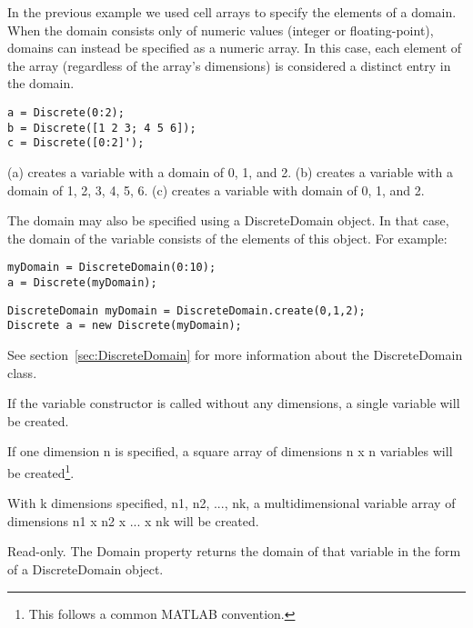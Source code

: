 In the previous example we used cell arrays to specify the elements of a domain.  When the domain consists only of numeric values (integer or floating-point), domains can instead be specified as a numeric array.  In this case, each element of the array (regardless of the array's dimensions) is considered a distinct entry in the domain.

\begin{lstlisting}
a = Discrete(0:2);
b = Discrete([1 2 3; 4 5 6]);
c = Discrete([0:2]');
\end{lstlisting}

(a) creates a variable with a domain of 0, 1, and 2.  (b) creates a variable with a domain of 1, 2, 3, 4, 5, 6.  (c) creates a variable with domain of 0, 1, and 2.

\fi

The domain may also be specified using a DiscreteDomain object.  In that case, the domain of the variable consists of the elements of this object.  For example:

\ifmatlab
\begin{lstlisting}
myDomain = DiscreteDomain(0:10);
a = Discrete(myDomain);
\end{lstlisting}
\fi

\ifjava
\begin{lstlisting}
DiscreteDomain myDomain = DiscreteDomain.create(0,1,2);
Discrete a = new Discrete(myDomain);
\end{lstlisting}
\fi

See section~\ref{sec:DiscreteDomain} for more information about the DiscreteDomain class.

\ifmatlab
{}
\label{sec:VariableMatrixDimensions}

If the variable constructor is called without any dimensions, a single variable will be created.

If one dimension n is specified, a square array of dimensions n x n variables will be created\footnote{This follows a common MATLAB convention.}.

With k dimensions specified, n1, n2, ..., nk, a multidimensional variable array of dimensions n1 x n2 x ... x nk will be created.

\fi


\label{sec:Discrete.Domain}

Read-only.  The Domain property returns the domain of that variable in the form of a DiscreteDomain object.

